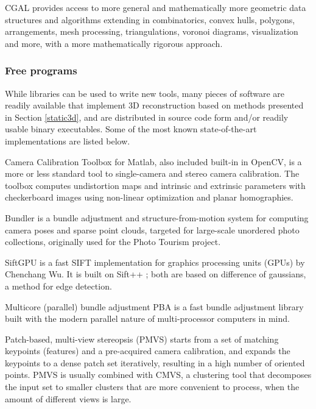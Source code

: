 CGAL provides access to more general and mathematically more geometric data structures and algorithms extending in combinatorics, convex hulls, polygons, arrangements, mesh processing, triangulations, voronoi diagrams, visualization and more, with a more mathematically rigorous approach.


\subsubsection{Free programs} %

While libraries can be used to write new tools, many pieces of software are readily available that implement 3D reconstruction based on methods presented in Section \ref{static3d}, and are distributed in source code form and/or readily usable binary executables.
Some of the most known state-of-the-art implementations are listed below.

Camera Calibration Toolbox for Matlab, also included built-in in OpenCV, is a more or less standard tool to single-camera and stereo camera calibration.
The toolbox computes undistortion maps and intrinsic and extrinsic parameters with checkerboard images using non-linear optimization and planar homographies. \cite{camcalmatlab}

Bundler is a bundle adjustment and structure-from-motion system for computing camera poses and sparse point clouds, targeted for large-scale unordered photo collections, originally used for the Photo Tourism project. \cite{snavely2006photo}

SiftGPU is a fast SIFT implementation for graphics processing units (GPUs) by Chenchang Wu. \cite{changchang2007siftgpu}
It is built on Sift++ \cite{vedaldi2011sift++}; both are based on difference of gaussians, a method for edge detection. \cite{marr1980theory}

Multicore (parallel) bundle adjustment PBA is a fast bundle adjustment library built with the modern parallel nature of multi-processor computers in mind. \cite{wu2011multicore}

Patch-based, multi-view stereopsis (PMVS) starts from a set of matching keypoints (features) and a pre-acquired camera calibration, and expands the keypoints to a dense patch set iteratively, resulting in a high number of oriented points.
PMVS is usually combined with CMVS, a clustering tool that decomposes the input set to smaller clusters that are more convenient to process, when the amount of different views is large. \cite{furukawa2010accurate,furukawa2012patch}

